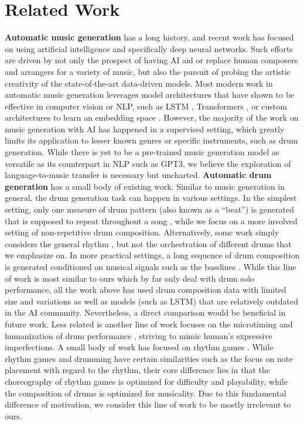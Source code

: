 \documentclass[letterpaper]{article} %
\begin{document}
\section{Related Work}

\textbf{Automatic music generation} has a long history, and recent work has focused on using artificial intelligence \cite{kaliakatsos2020artificial} and specifically deep neural networks. Such efforts are driven by not only the prospect of having AI aid or replace human composers and arrangers for a variety of music, but also the pursuit of probing the artistic creativity of the state-of-the-art data-driven models. Most modern work in automatic music generation leverages model architectures that have shown to be effective in computer vision or NLP, such as LSTM \cite{lyu2015modelling}, Transformers \citep{huang2018music,zeng2021musicbert,https://doi.org/10.48550/arxiv.2210.10349}, or custom architectures to learn an embedding space \cite{liang2020pirhdy}. However, the majority of the work on music generation with AI has happened in a supervised setting, which greatly limits its application to lesser known genres or specific instruments, such as drum generation. While there is yet to be a pre-trained music generation model as versatile as its counterpart in NLP such as GPT3, we believe the exploration of language-to-music transfer is necessary but uncharted.  \textbf{Automatic drum generation} has a small body of existing work. Similar to music generation in general, the drum generation task can happen in various settings. In the simplest setting, only one measure of drum pattern (also known as a ``beat'') is generated that is supposed to repeat throughout a song  \cite{vogl2017intelligent,bruford2020jaki,complexis21}, while we focus on a more involved setting of non-repetitive drum composition. Alternatively, some work simply considers the general rhythm \cite{lattner2019high}, but not the orchestration of different drums that we emphasize on. In more practical settings, a long sequence of drum composition is generated conditioned on musical signals such as the basslines \cite{makris2017combining,makris2019conditional}. While this line of work is most similar to ours which by far only deal with drum solo performance, all the work above has used drum composition data with limited size and variations as well as models (such as LSTM) that are relatively outdated in the AI community. Nevertheless, a direct comparison would be beneficial in future work. Less related is another line of work focuses on the microtiming and humanization of drum performance \cite{gillick2019learning,burloiu2020adaptive,burloiu2020interactive}, striving to mimic human's expressive imperfections.  A small body of work has focused on rhythm games \cite{donahue2017dance,liang2019procedural}. While rhythm games and drumming have certain similarities such as the focus on note placement with regard to the rhythm, their core difference lies in that the choreography of rhythm games is optimized for difficulty and playability, while the composition of drums is optimized for musicality. Due to this fundamental difference of motivation, we consider this line of work to be mostly irrelevant to ours.
\end{document}
